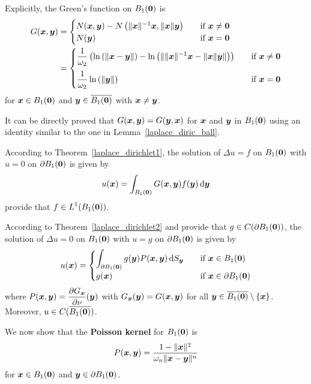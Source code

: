 Explicitly, the Green's function on $B_1({\bm{0}})$ is
\begin{align*}
G({\bm{x}},{\bm{y}}) &=
\begin{cases}
N({\bm{x}},{\bm{y}}) - N\left(\|{\bm{x}}\|^{-1} {\bm{x}},\|{\bm{x}}\|{\bm{y}}\right)
& \quad \text{if} \ {\bm{x}} \neq {\bm{0}} \\
\displaystyle N({\bm{y}}) & \quad \text{if} \ {\bm{x}} = {\bm{0}}
\end{cases} \\
&= \begin{cases}
\displaystyle \frac{1}{\omega_2} \left( \ln\left(\|{\bm{x}}-{\bm{y}}\|\right)
- \ln\left( \| \|{\bm{x}}\|^{-1} {\bm{x}}- \|{\bm{x}}\| {\bm{y}} \|\right) \right)
& \quad \text{if} \ {\bm{x}} \neq {\bm{0}} \\[1em]
\displaystyle \frac{1}{\omega_2} \ln\left(\|{\bm{y}}\|\right)
& \quad \text{if} \ {\bm{x}} = {\bm{0}}
\end{cases}
\end{align*}
for ${\bm{x}} \in B_1({\bm{0}})$ and ${\bm{y}} \in \overline{B_1({\bm{0}})}$
with ${\bm{x}} \neq {\bm{y}}$.

\begin{rmk}
It can be directly proved that $G({\bm{x}},{\bm{y}}) = G({\bm{y}},{\bm{x}})$
for ${\bm{x}}$ and ${\bm{y}}$ in $B_1({\bm{0}})$ using an identity
similar to the one in Lemma~\ref{laplace_diric_ball}.
\end{rmk}

According to Theorem~\ref{laplace_dirichlet1}, the solution of
$\Delta u = f$ on $B_1({\bm{0}})$ with $u = 0$ on
$\partial B_1({\bm{0}})$ is given by
\[
u({\bm{x}}) = \int_{B_1({\bm{0}})} G({\bm{x}},{\bm{y}})f({\bm{y}}) \,\mathrm{d}{{\bm{y}}}
\]
provide that $\displaystyle f\in L^1(B_1({\bm{0}}))$.

According to Theorem~\ref{laplace_dirichlet2} and provide that
$g\in C(\partial B_1({\bm{0}}))$, the solution of
$\Delta u = 0$ on $B_1({\bm{0}})$ with $u = g$ on $\partial B_1({\bm{0}})$
is given by
\[
u({\bm{x}}) =
\begin{cases}
\displaystyle
\int_{\partial B_1({\bm{0}})} g({\bm{y}}) P({\bm{x}},{\bm{y}}) \,\mathrm{d}{S}_{{\bm{y}}} &
\quad \text{if} \ {\bm{x}} \in B_1({\bm{0}}) \\
g({\bm{x}}) & \quad \text{if} \ {\bm{x}} \in \partial B_1({\bm{0}})
\end{cases}
\]
where
$\displaystyle P({\bm{x}},{\bm{y}}) =
\frac{\partial{G_{{\bm{x}}}}}{\partial \nu}({\bm{y}})$ with
$G_{{\bm{x}}}({\bm{y}}) = G({\bm{x}},{\bm{y}})$ for all
${\bm{y}} \in \overline{B_1({\bm{0}})} \setminus \{{\bm{x}}\}$.  Moreover,
$u \in C(\overline{B_1({\bm{0}})})$.

We now show that the {\bfseries Poisson kernel}
for $B_1({\bm{0}})$ is
\begin{equation} \label{laplace_green_ball}
P({\bm{x}},{\bm{y}}) =
\frac{1-\|{\bm{x}}\|^2}{\omega_n \|{\bm{x}}-{\bm{y}}\|^n}
\end{equation}
for ${\bm{x}}\in B_1({\bm{0}})$ and ${\bm{y}} \in \partial B_1({\bm{0}})$.

